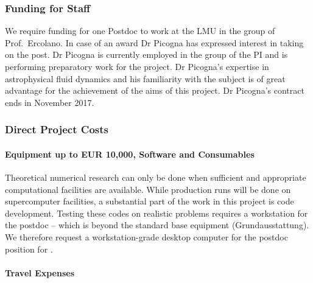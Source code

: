 \documentclass[10pt,fleqn,twoside]{article}
\begin{document}
\subsubsection{Funding for Staff}

We require funding for one Postdoc to work at the LMU in the group of
Prof.\ Ercolano. In case of an award Dr Picogna has expressed interest
in taking on the post. Dr Picogna is currently employed in the group of the
PI and is performing preparatory work for the project. Dr Picogna's
expertise in astrophysical fluid dynamics and his familiarity with the
subject is of great advantage for the achievement of the aims of this
project. Dr Picogna's contract ends in November 2017.

\subsubsection{Direct Project Costs}


\paragraph{Equipment up to EUR 10,000, Software and Consumables}

Theoretical numerical research can only be done when sufficient and
appropriate computational facilities are available. While production
runs will be done on supercomputer facilities, a substantial part of
the work in this project is code development. Testing these codes on
realistic problems requires a workstation for the postdoc -- which is
beyond the standard base equipment 
(Grundausstattung). We therefore request a workstation-grade desktop
computer for the postdoc position for .

\paragraph{Travel Expenses}

% 
% 
\end{document}
